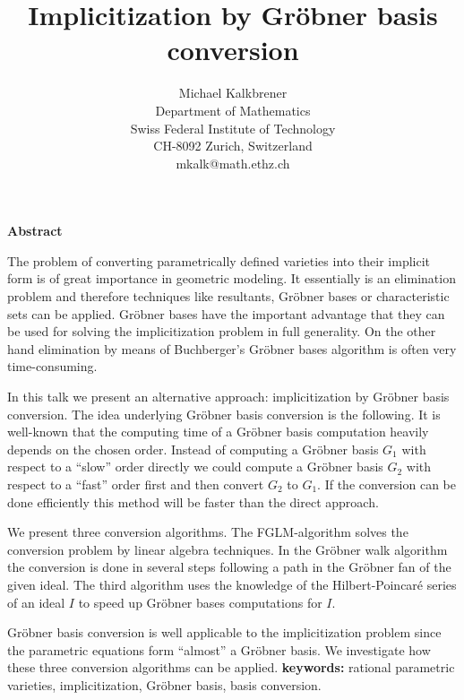 \textheight 200mm
\title{Implicitization by Gr\"obner basis conversion}
\author{Michael Kalkbrener\\Department of Mathematics\\
Swiss Federal Institute of 
Technology\\
CH-8092 Zurich, Switzerland \\
mkalk@math.ethz.ch}



\date{} 
\pagestyle{empty}




\maketitle

\centerline{\bf Abstract}

\medskip
The problem of converting parametrically defined varieties into 
their implicit form is of great importance in geometric modeling.
It essentially is an elimination problem and therefore 
techniques like resultants, Gr\"obner bases or characteristic sets
can be applied.
Gr\"obner bases have the important 
advantage that
they can be used for solving the implicitization problem in full 
generality. On the other hand elimination by means of Buchberger's 
Gr\"obner bases algorithm is often very time-consuming.

In this talk we present an alternative approach: 
implicitization by Gr\"ob\-ner basis conversion.
The idea underlying Gr\"obner basis
conversion is the following. It is well-known that the computing
time of a Gr\"obner basis computation 
heavily depends on the chosen order. Instead of computing 
a Gr\"obner basis $G_1$
with respect to a ``slow'' order directly
we could compute a Gr\"obner basis $G_2$
with respect to a ``fast'' order first and then convert $G_2$ to $G_1$.
If the conversion can be done efficiently this method will be faster than
the direct approach. 

We present three conversion algorithms. 
The FGLM-algorithm solves the conversion problem by linear algebra techniques.
In the Gr\"obner walk algorithm the conversion is done in several 
steps following a
path in the Gr\"obner fan of the given ideal. The third algorithm uses the
knowledge of the
Hilbert-Poincar\'e series of an ideal $I$ to speed up Gr\"obner bases 
computations for $I$.

Gr\"obner basis conversion is well applicable to the implicitization
problem since the parametric equations form ``almost'' a Gr\"obner basis.
We investigate how these three conversion 
algorithms can be applied.
\vspace{2 mm}
\newline
{\bf keywords:} rational parametric varieties, implicitization, Gr\"obner 
basis, basis conversion.

